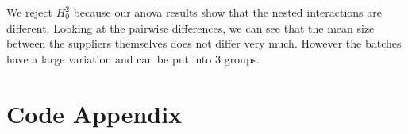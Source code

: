 \documentclass[paper=a4, fontsize=11pt]{scrartcl} %
\numberwithin{equation}{section} %
\numberwithin{figure}{section} %
\numberwithin{table}{section} %
\begin{document}
We reject $H_0^2$ because our anova results show that the nested interactions are different. Looking at the pairwise differences, we can see that the mean size between the suppliers themselves does not differ very much. However the batches have a large variation and can be put into 3 groups.

\newpage





\newpage
\section*{Code Appendix}

\end{document}
